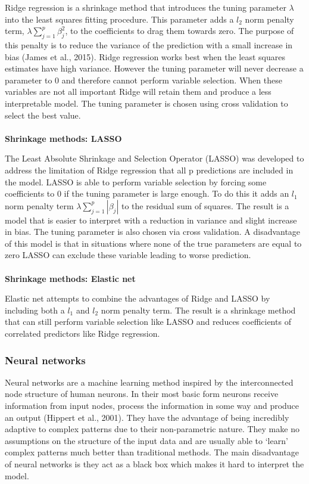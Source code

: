\documentclass[11pt]{article}
\begin{document}
\noindent Ridge regression is a shrinkage method that introduces the tuning parameter $\lambda$ into the least squares fitting procedure. This parameter adds a $l_2$ norm penalty term, $\lambda \sum_{j=1}^{p} \beta_j^2$, to the coefficients to drag them towards zero. The purpose of this penalty is to reduce the variance of the prediction with a small increase in bias (James et al., 2015). Ridge regression works best when the least squares estimates have high variance. However the tuning parameter will never decrease a parameter to 0 and therefore cannot perform variable selection. When these variables are not all important Ridge will retain them and produce a less interpretable model. The tuning parameter is chosen using cross validation to select the best value.
\\
\\
\textbf{Shrinkage methods: LASSO}

\noindent The Least Absolute Shrinkage and Selection Operator (LASSO) was developed to address the limitation of Ridge regression that all p predictions are included in the model. LASSO is able to perform variable selection by forcing some coefficients to 0 if the tuning parameter is large enough. To do this it adds an $l_1$ norm penalty term $\lambda \sum_{j=1}^{p} |\beta_j|$ to the residual sum of squares. The result is a model that is easier to interpret with a reduction in variance and slight increase in bias. The tuning parameter is also chosen via cross validation. A disadvantage of this model is that in situations where none of the true parameters are equal to zero LASSO can exclude these variable leading to worse prediction.
\\
\\
\textbf{Shrinkage methods: Elastic net}

\noindent Elastic net attempts to combine the advantages of Ridge and LASSO by including both a $l_1$ and $l_2$ norm penalty term. The result is a shrinkage method that can still perform variable selection like LASSO and reduces coefficients of correlated predictors like Ridge regression. 

\subsubsection{Neural networks}

Neural networks are a machine learning method inspired by the interconnected node structure of human neurons. In their most basic form neurons receive information from input nodes, process the information in some way and produce an output (Hippert et al., 2001). They have the advantage of being incredibly adaptive to complex patterns due to their non-parametric nature. They make no assumptions on the structure of the input data and are usually able to `learn' complex patterns much better than traditional methods. The main disadvantage of neural networks is they act as a black box which makes it hard to interpret the model. 
\end{document}
